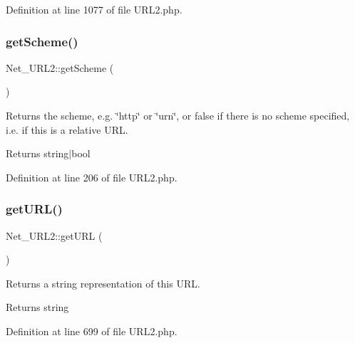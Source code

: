 Definition at line 1077 of file U\+R\+L2.\+php.

\mbox{\label{classNet__URL2_a9ebbd0b1bc71024ce48593cb1faeff41}} 
\subsubsection{\texorpdfstring{get\+Scheme()}{getScheme()}}
{\footnotesize\ttfamily Net\+\_\+\+U\+R\+L2\+::get\+Scheme (\begin{DoxyParamCaption}{ }\end{DoxyParamCaption})}

Returns the scheme, e.\+g. \char`\"{}http\char`\"{} or \char`\"{}urn\char`\"{}, or false if there is no scheme specified, i.\+e. if this is a relative U\+RL.

\begin{DoxyReturn}{Returns}
string$\vert$bool 
\end{DoxyReturn}


Definition at line 206 of file U\+R\+L2.\+php.

\mbox{\label{classNet__URL2_a77d3197589861087e09db160a78c7ee1}} 
\subsubsection{\texorpdfstring{get\+U\+R\+L()}{getURL()}}
{\footnotesize\ttfamily Net\+\_\+\+U\+R\+L2\+::get\+U\+RL (\begin{DoxyParamCaption}{ }\end{DoxyParamCaption})}

Returns a string representation of this U\+RL.

\begin{DoxyReturn}{Returns}
string 
\end{DoxyReturn}


Definition at line 699 of file U\+R\+L2.\+php.

\mbox{\label{classNet__URL2_ad06292db039e4723ce457f416fc61763}} 
